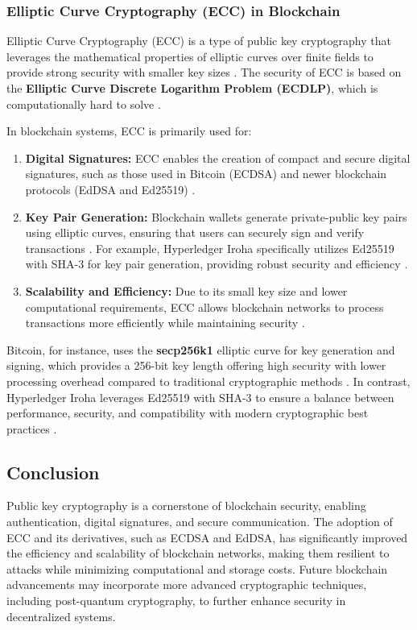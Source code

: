 \documentclass{article}
\begin{document}
\subsubsection{Elliptic Curve Cryptography (ECC) in Blockchain}
Elliptic Curve Cryptography (ECC) is a type of public key cryptography that leverages the mathematical properties of elliptic curves over finite fields to provide strong security with smaller key sizes \cite{koblitz1987elliptic}. The security of ECC is based on the \textbf{Elliptic Curve Discrete Logarithm Problem (ECDLP)}, which is computationally hard to solve \cite{hankerson2006guide}.

In blockchain systems, ECC is primarily used for:
\begin{enumerate}
    \item \textbf{Digital Signatures:} ECC enables the creation of compact and secure digital signatures, such as those used in Bitcoin (ECDSA) and newer blockchain protocols (EdDSA and Ed25519) \cite{johnson2001elliptic, bernstein2012high}.
    \item \textbf{Key Pair Generation:} Blockchain wallets generate private-public key pairs using elliptic curves, ensuring that users can securely sign and verify transactions \cite{wu2018blockchain}. For example, Hyperledger Iroha specifically utilizes Ed25519 with SHA-3 for key pair generation, providing robust security and efficiency \cite{hyperledger_iroha}.
    \item \textbf{Scalability and Efficiency:} Due to its small key size and lower computational requirements, ECC allows blockchain networks to process transactions more efficiently while maintaining security \cite{fan2018analysis}.
\end{enumerate}

Bitcoin, for instance, uses the \textbf{secp256k1} elliptic curve for key generation and signing, which provides a 256-bit key length offering high security with lower processing overhead compared to traditional cryptographic methods \cite{brown2010standards}. In contrast, Hyperledger Iroha leverages Ed25519 with SHA-3 to ensure a balance between performance, security, and compatibility with modern cryptographic best practices \cite{hyperledger_iroha}.

\subsection*{Conclusion}
Public key cryptography is a cornerstone of blockchain security, enabling authentication, digital signatures, and secure communication. The adoption of ECC and its derivatives, such as ECDSA and EdDSA, has significantly improved the efficiency and scalability of blockchain networks, making them resilient to attacks while minimizing computational and storage costs. Future blockchain advancements may incorporate more advanced cryptographic techniques, including post-quantum cryptography, to further enhance security in decentralized systems.
\end{document}
